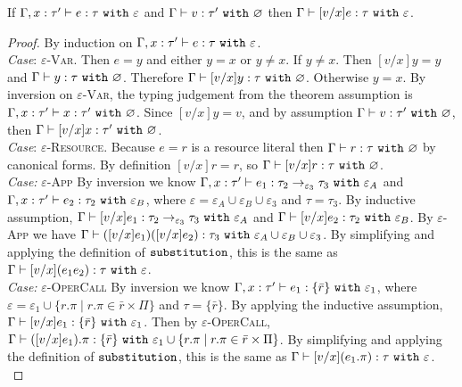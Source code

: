 \begin{appendix}
\hrulefill

\begin{lemma}[Substitution]
If $\Gamma, x: \tau' \vdash e: \tau~\mathtt{with}~ \varepsilon$ and $ \Gamma \vdash  v: \tau'~\mathtt{with}~ \varnothing$ then $ \Gamma \vdash [ v/x]e:  \tau~\mathtt{with}~ \varepsilon$.
\end{lemma}

\begin{proof} By induction on $ \Gamma, x:  \tau' \vdash e:  \tau~\mathtt{with}~ \varepsilon$. \\

\textit{Case}: \textsc{$\varepsilon$-Var}. Then $ e = y$ and either $y = x$ or $y \neq x$. If $y \neq x$. Then $[ v/x]y = y$ and $ \Gamma \vdash y:  \tau~\mathtt{with}~ \varnothing$. Therefore $ \Gamma \vdash [ v/x]y:  \tau~\mathtt{with}~ \varnothing$. Otherwise $y = x$. By inversion on \textsc{$\varepsilon$-Var}, the typing judgement from the theorem assumption is $ \Gamma, x:  \tau' \vdash x:  \tau'~\mathtt{with}~ \varnothing$. Since $[ v/x]y =  v$, and by assumption $ \Gamma \vdash  v:  \tau'~\mathtt{with}~ \varnothing$, then $ \Gamma \vdash [ v/x]x:  \tau'~\mathtt{with}~ \varnothing$. \\

\textit{Case}: \textsc{$\varepsilon$-Resource}. Because $ e = r$ is a resource literal then $ \Gamma \vdash r:  \tau~\mathtt{with}~ \varnothing$ by canonical forms. By definition $[ v/x]r = r$, so $ \Gamma \vdash [ v/x]r:  \tau~\mathtt{with}~ \varnothing$. \\

\textit{Case:} \textsc{$\varepsilon$-App} By inversion we know $ \Gamma, x:  \tau' \vdash  e_1: \tau_2 \rightarrow_{\varepsilon_3}  \tau_3~\mathtt{with}~ \varepsilon_A$ and $ \Gamma, x:  \tau' \vdash  e_2:  \tau_2~\mathtt{with}~ \varepsilon_B$, where $\varepsilon = \varepsilon_A \cup \varepsilon_B \cup \varepsilon_3$ and $ \tau =  \tau_3$. By inductive assumption, $ \Gamma \vdash [ v/x] e_1:  \tau_2 \rightarrow_{\varepsilon_3}  \tau_3~\mathtt{with}~ \varepsilon_A$ and $ \Gamma \vdash [ v/x] e_2:  \tau_2~\mathtt{with}~ \varepsilon_B$. By \textsc{$\varepsilon$-App} we have $ \Gamma \vdash ([ v/x] e_1) ([ v/x] e_2) :  \tau_3~\mathtt{with}~ \varepsilon_A \cup \varepsilon_B \cup \varepsilon_3$. By simplifying and applying the definition of $\mathtt{substitution}$, this is the same as $ \Gamma \vdash [ v/x]( e_1  e_2):  \tau~\mathtt{with}~ \varepsilon$. \\

\textit{Case:} \textsc{$\varepsilon$-OperCall} By inversion we know $ \Gamma, x:  \tau' \vdash  e_1: \{ \bar r \}~\mathtt{with}~ \varepsilon_1$, where $\varepsilon = \varepsilon_1 \cup \{ r.\pi \mid r.\pi \in \bar r \times \Pi \}$ and $ \tau = \{ \bar r \}$. By applying the inductive assumption, $ \Gamma \vdash [ v/x] e_1 : \{ \bar r \} ~\mathtt{with}~ \varepsilon_1$. Then by \textsc{$\varepsilon$-OperCall}, $ \Gamma \vdash ([ v/x] e_1).\pi: \{ \bar r \}~\mathtt{with}~ \varepsilon_1 \cup \{ r.\pi \mid r.\pi \in \bar r \times \Pi \}$. By simplifying and applying the definition of $\mathtt{substitution}$, this is the same as $ \Gamma \vdash [ v/x]( e_1.\pi):  \tau~\mathtt{with}~ \varepsilon$.\\


\end{proof}
\end{appendix}
